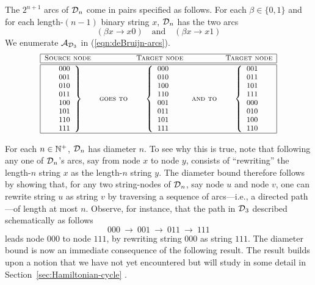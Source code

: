 The $2^{n+1}$ arcs of $\mbox{$\cal D$}_n$ come in pairs specified as follows.  For
each $\beta \in \{0,1\}$ and for each length-$(n-1)$ binary string
$x$, $\mbox{$\cal D$}_n$ has the two arcs
\[ (\beta x \rightarrow x0) \ \ \ \mbox{ and } \ \ \ 
(\beta x \rightarrow x1)
\]
We enumerate $\mbox{$\cal A$}_{\mbox{{\scriptsize $\cal D$}}_3}$ in (\ref{eqn:deBruijn-arcs}).
\begin{equation}
\label{eqn:deBruijn-arcs}
{\small
\begin{array}{|ccccc|}
\hline
\mbox{\sc Source node} & & \mbox{\sc Target node} & & \mbox{\sc Target node} \\
\hline \hline
{\displaystyle
\left.
\begin{array}{c}
000 \\
001 \\
010 \\
011 \\
100 \\
101 \\
110 \\
111
\end{array}
\right\}
} &
\mbox{\sc goes to} 
  &
{\displaystyle
\left\{
\begin{array}{c}
000 \\
010 \\
100 \\
110 \\
001 \\
011 \\
101 \\
111
\end{array}
\right.
}
  &
\mbox{\sc and to}
  &
{\displaystyle
\left\{
\begin{array}{c}
001 \\
011 \\
101 \\
111 \\
000 \\
010 \\
100 \\
110
\end{array} 
\right.
}
 \\
\hline
\end{array}
}
\end{equation}

For each $n \in \mathbb{N}^+$, $\mbox{$\cal D$}_n$ has diameter $n$.  To see why this is
true, note that following any one of $\mbox{$\cal D$}_n$'s arcs, say from node $x$
to node $y$, consists of ``rewriting'' the length-$n$ string $x$ as
the length-$n$ string $y$.  The diameter bound therefore follows by
showing that, for any two string-nodes of $\mbox{$\cal D$}_n$, say node $u$ and
node $v$, one can rewrite string $u$ as string $v$ by traversing a
sequence of arcs---i.e., a directed path---of length at most $n$.
Observe, for instance, that the path in $\mbox{$\cal D$}_3$ described schematically
as follows
\[ 000 \ \rightarrow \ 001 \ \rightarrow \ 011 \ \rightarrow \ 111 \]
leads node $000$ to node $111$, by rewriting string $000$ as string
$111$.  The diameter bound is now an immediate consequence of the
following result.  The result builds upon a notion that we have not
yet encountered but will study in some detail in
Section~\ref{sec:Hamiltonian-cycle}
 .

